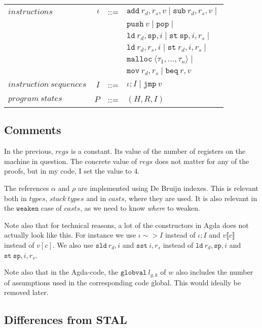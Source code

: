 \begin{tabular}{lrcl}
\\
$instructions$ & $\iota$ & ::= & $\mathtt{add}\ r_d, r_s, v \mid \mathtt{sub}\ r_d, r_s, v \mid$ \\
        &&& $\mathtt{push}\ v \mid \mathtt{pop} \mid$ \\
        &&& $\mathtt{ld}\ r_d, \mathtt{sp}, i \mid \mathtt{st}\ \mathtt{sp}, i, r_s \mid$\\
        &&& $\mathtt{ld}\ r_d, r_s, i \mid \mathtt{st}\ r_d, i, r_s \mid$\\
        &&& $\mathtt{malloc}\ \langle \tau_1, \dots, \tau_n \rangle \mid $ \\
        &&& $\mathtt{mov}\ r_d, r_s \mid \mathtt{beq}\ r, v$ \\
$instruction\ sequences$ & $I$ & ::= & $\iota ; I \mid \mathtt{jmp}\ v$ \\
$program\ states$ & $P$ & ::= & $(H, R, I)$ \\
\end{tabular}

\subsection{Comments}
In the previous, $regs$ is a constant. Its value of the number of registers on
the machine in question. The concrete value of $regs$ does not matter for any of
the proofs, but in my code, I set the value to $4$.

The references $\alpha$ and $\rho$ are implemented using De Bruijn indexes. This
is relevant both in $types$, $stack\ types$ and in $casts$, where they are
used. It is also relevant in the $\mathtt{weaken}$ case of $casts$, as we need
to know \emph{where} to weaken.

Note also that for technical reasons, a lot of the constructors in Agda does not
actually look like this. For instance we use $\iota \sim> I$ instead of
$\iota ; I$ and $v \llbracket c \rrbracket$ instead of $v [ c ]$. We also use
$\mathtt{sld}\ r_d, i$ and $\mathtt{sst}\ i, r_s$ instead of
$\mathtt{ld}\ r_d, \mathtt{sp}, i$ and $\mathtt{st}\ \mathtt{sp}, i, r_s$.

Note also that in the Agda-code, the $\mathtt{globval}\ l_{g,k}$ of $w$ also
includes the number of assumptions used in the corresponding code global. This
would ideally be removed later.

\subsection{Differences from STAL}

